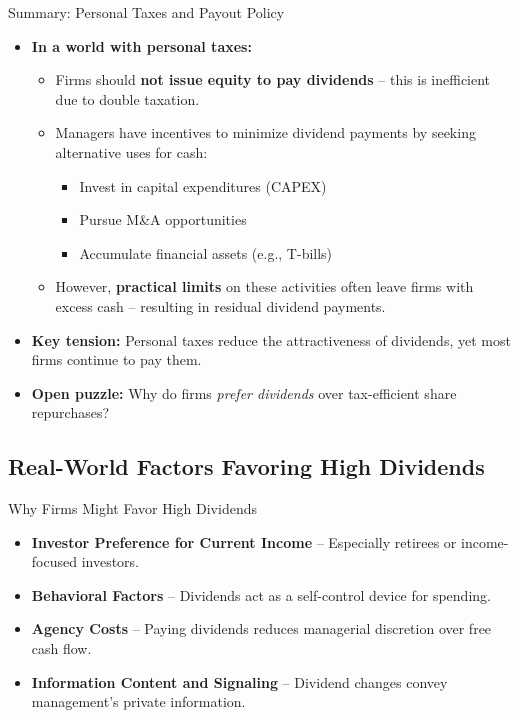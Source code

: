 \begin{frame}{Summary: Personal Taxes and Payout Policy}
	\begin{itemize}
		\item \textbf{In a world with personal taxes:}
		\begin{itemize}
			\item Firms should \textbf{not issue equity to pay dividends} -- this is inefficient due to double taxation.
			\item Managers have incentives to minimize dividend payments by seeking alternative uses for cash:
			\begin{itemize}
				\item Invest in capital expenditures (CAPEX)
				\item Pursue M\&A opportunities
				\item Accumulate financial assets (e.g., T-bills)
			\end{itemize}
			\item However, \textbf{practical limits} on these activities often leave firms with excess cash -- resulting in residual dividend payments.
		\end{itemize}
		\vspace{0.2cm}
		\item \textbf{Key tension:}  
		Personal taxes reduce the attractiveness of dividends, yet most firms continue to pay them.
		
		\item \textbf{Open puzzle:}  
		Why do firms \textit{prefer dividends} over tax-efficient share repurchases?
	\end{itemize}
\end{frame}

\subsection{Real-World Factors Favoring High Dividends}
\begin{frame}{Why Firms Might Favor High Dividends}
	\begin{itemize}
		\item \textbf{Investor Preference for Current Income} -- Especially retirees or income-focused investors.
		\item \textbf{Behavioral Factors} -- Dividends act as a self-control device for spending.
		\item \textbf{Agency Costs} -- Paying dividends reduces managerial discretion over free cash flow.
		\item \textbf{Information Content and Signaling} -- Dividend changes convey management's private information.
	\end{itemize}
\end{frame}

